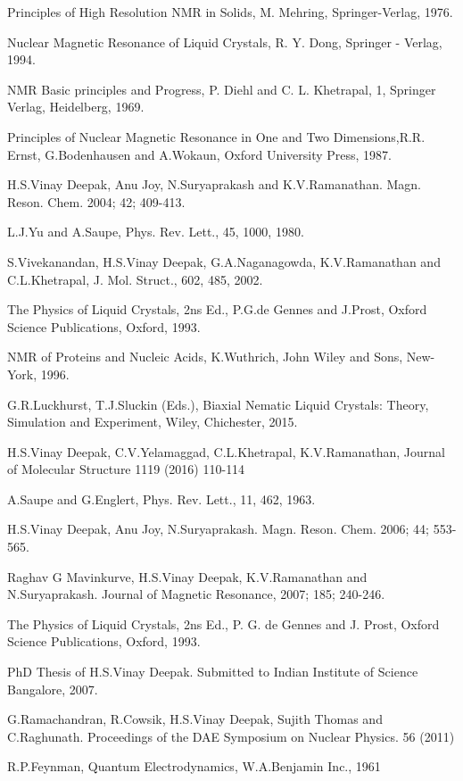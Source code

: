 \begin{thebibliography}{99}
 Principles of High Resolution NMR in Solids, M. Mehring, Springer-Verlag, 1976.

 Nuclear Magnetic Resonance of Liquid Crystals, R. Y. Dong, Springer - Verlag, 1994.

 NMR Basic principles and Progress, P. Diehl and C. L. Khetrapal, 1, Springer Verlag, Heidelberg, 1969.

 Principles of Nuclear Magnetic Resonance in One and Two Dimensions,R.R. Ernst, G.Bodenhausen and A.Wokaun, Oxford University Press, 1987.

 H.S.Vinay Deepak, Anu Joy, N.Suryaprakash and K.V.Ramanathan. Magn. Reson. Chem. 2004; 42; 409-413.

 L.J.Yu and A.Saupe, Phys. Rev. Lett., 45, 1000, 1980.

 S.Vivekanandan, H.S.Vinay Deepak, G.A.Naganagowda, K.V.Ramanathan and C.L.Khetrapal, J. Mol. Struct., 602, 485, 2002.

 The Physics of Liquid Crystals, 2ns Ed., P.G.de Gennes and J.Prost, Oxford Science Publications, Oxford, 1993.

 NMR of Proteins and Nucleic Acids, K.Wuthrich, John Wiley and Sons, New-York, 1996.

 G.R.Luckhurst, T.J.Sluckin (Eds.), Biaxial Nematic Liquid Crystals: Theory, Simulation and Experiment, Wiley, Chichester, 2015.

 H.S.Vinay Deepak, C.V.Yelamaggad, C.L.Khetrapal, K.V.Ramanathan, Journal of Molecular Structure 1119 (2016) 110-114

 A.Saupe and G.Englert, Phys. Rev. Lett., 11, 462, 1963.

 H.S.Vinay Deepak, Anu Joy, N.Suryaprakash. Magn. Reson. Chem. 2006; 44; 553-565.

 Raghav G Mavinkurve, H.S.Vinay Deepak, K.V.Ramanathan and N.Suryaprakash. Journal of Magnetic Resonance, 2007; 185; 240-246.

 The Physics of Liquid Crystals, 2ns Ed., P. G. de Gennes and J. Prost, Oxford Science Publications, Oxford, 1993.

 PhD Thesis of H.S.Vinay Deepak. Submitted to Indian Institute of Science Bangalore, 2007.

 G.Ramachandran, R.Cowsik, H.S.Vinay Deepak, Sujith Thomas and C.Raghunath. Proceedings of the DAE Symposium on Nuclear Physics. 56 (2011)

 R.P.Feynman, Quantum Electrodynamics, W.A.Benjamin Inc., 1961
\end{thebibliography}

